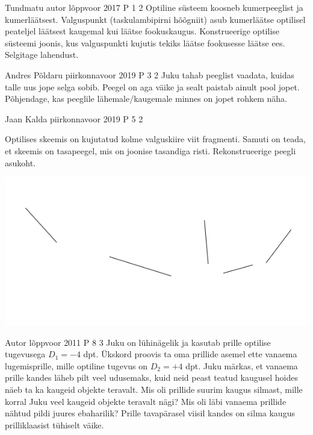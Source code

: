 \documentclass[11pt]{article}
\begin{document}
{%
{Tundmatu autor} %
{lõppvoor} %
{2017} %
{P 1} %
{2} %
{
\ifStatement
Optiline süsteem koosneb kumerpeeglist ja kumerläätsest. Valguspunkt (taskulambipirni hõõgniit) asub kumerläätse optilisel peateljel läätsest kaugemal kui läätse fookuskaugus. Konstrueerige optilise süsteemi joonis, kus valguspunkti kujutis tekiks läätse fookusesse läätse ees. Selgitage lahendust.
\fi
}


{Andres Põldaru} %
{piirkonnavoor} %
{2019} %
{P 3} %
{2} %
{
\ifStatement
Juku tahab peeglist vaadata, kuidas talle uus jope selga sobib. Peegel on aga väike ja sealt paistab ainult pool jopet. Põhjendage, kas peeglile lähemale/kaugemale minnes on jopet rohkem näha. 
\fi
}


{Jaan Kalda} %
{piirkonnavoor} %
{2019} %
{P 5} %
{2} %
{
\ifStatement
Optilises skeemis on kujutatud kolme valguskiire viit fragmenti. Samuti on teada, et skeemis on tasapeegel, mis on joonise tasandiga risti. Rekonstrueerige peegli asukoht. 
\begin{center}
	\includegraphics[width=0.5\linewidth]{2019-v2p-05-yl.PNG}
\end{center}
\fi
}


{Autor} %
{lõppvoor} %
{2011} %
{P 8} %
{3} %
{
\ifStatement
Juku on lühinägelik ja kasutab prille optilise tugevusega $D_1 = -4$ dpt. Ükskord proovis ta oma prillide asemel ette vanaema lugemisprille, mille optiline tugevus on $D_2 = +4$ dpt. Juku märkas, et vanaema prille kandes läheb pilt veel udusemaks, kuid neid peast teatud kaugusel hoides näeb ta ka kaugeid objekte teravalt. Mis oli prillide suurim kaugus silmast, mille korral Juku veel kaugeid objekte teravalt nägi? Mis oli läbi vanaema prillide nähtud pildi juures ebaharilik? Prille tavapärasel viisil kandes on silma kaugus prilliklaasist tühiselt väike.
\fi
}


}
\end{document}
